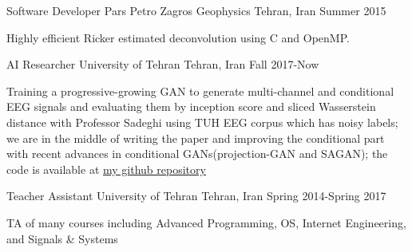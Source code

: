\begin{cventries}
  \cventry
    {Software Developer} %
    {Pars Petro Zagros Geophysics} %
    {Tehran, Iran} %
    {Summer 2015} %
    {
      \begin{cvitems} %
        \item {Highly efficient Ricker estimated deconvolution using C and OpenMP.}
      \end{cvitems}
    }


\end{cventries}



\begin{cventries}

 \cventry
    {AI Researcher} %
    {University of Tehran} %
    {Tehran, Iran} %
    {Fall 2017-Now} %
    {
      \begin{cvitems} %
      	\item {Training a progressive-growing GAN to generate multi-channel and conditional EEG signals and evaluating them by inception score and sliced Wasserstein distance with Professor Sadeghi using TUH EEG corpus which has noisy labels; we are in the middle of writing the paper and improving the conditional part with recent advances in conditional GANs(projection-GAN and SAGAN); the code is available at \href{https://github.com/Separius/EEG-GAN}{my github repository}}
      \end{cvitems}
    }

 \cventry
    {Teacher Assistant} %
    {University of Tehran} %
    {Tehran, Iran} %
    {Spring 2014-Spring 2017} %
    {
      \begin{cvitems} %
        \item {TA of many courses including Advanced Programming, OS, Internet Engineering, and Signals \& Systems}
      \end{cvitems}
    }
\end{cventries}
